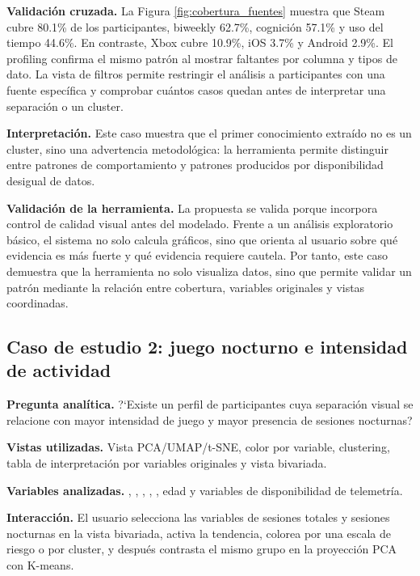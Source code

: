 \documentclass[12pt,a4paper]{article}
\begin{document}
\textbf{Validaci\'on cruzada.} La Figura \ref{fig:cobertura_fuentes} muestra que Steam cubre 80.1\% de los participantes, biweekly 62.7\%, cognici\'on 57.1\% y uso del tiempo 44.6\%. En contraste, Xbox cubre 10.9\%, iOS 3.7\% y Android 2.9\%. El profiling confirma el mismo patr\'on al mostrar faltantes por columna y tipos de dato. La vista de filtros permite restringir el an\'alisis a participantes con una fuente espec\'ifica y comprobar cu\'antos casos quedan antes de interpretar una separaci\'on o un cluster.

\textbf{Interpretaci\'on.} Este caso muestra que el primer conocimiento extra\'ido no es un cluster, sino una advertencia metodol\'ogica: la herramienta permite distinguir entre patrones de comportamiento y patrones producidos por disponibilidad desigual de datos.

\textbf{Validaci\'on de la herramienta.} La propuesta se valida porque incorpora control de calidad visual antes del modelado. Frente a un an\'alisis exploratorio b\'asico, el sistema no solo calcula gr\'aficos, sino que orienta al usuario sobre qu\'e evidencia es m\'as fuerte y qu\'e evidencia requiere cautela. Por tanto, este caso demuestra que la herramienta no solo visualiza datos, sino que permite validar un patr\'on mediante la relaci\'on entre cobertura, variables originales y vistas coordinadas.

\subsection{Caso de estudio 2: juego nocturno e intensidad de actividad}

\textbf{Pregunta anal\'itica.} ?`Existe un perfil de participantes cuya separaci\'on visual se relacione con mayor intensidad de juego y mayor presencia de sesiones nocturnas?

\textbf{Vistas utilizadas.} Vista PCA/UMAP/t-SNE, color por variable, clustering, tabla de interpretaci\'on por variables originales y vista bivariada.

\textbf{Variables analizadas.} , , , , , edad y variables de disponibilidad de telemetr\'ia.

\textbf{Interacci\'on.} El usuario selecciona las variables de sesiones totales y sesiones nocturnas en la vista bivariada, activa la tendencia, colorea por una escala de riesgo o por cluster, y despu\'es contrasta el mismo grupo en la proyecci\'on PCA con K-means.
\end{document}
